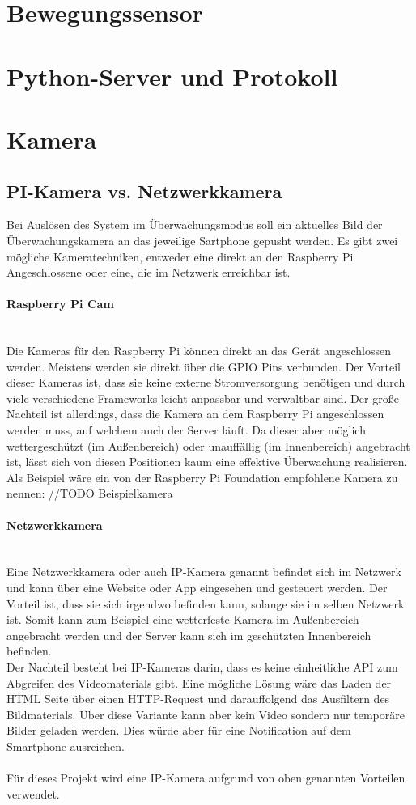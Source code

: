 \section{Bewegungssensor} 

\section{Python-Server und Protokoll} 
\section{Kamera}
\subsection{PI-Kamera vs. Netzwerkkamera}
Bei Auslösen des System im Überwachungsmodus soll ein aktuelles Bild der Überwachungskamera an das jeweilige Sartphone gepusht werden. Es gibt zwei mögliche Kameratechniken, entweder eine direkt an den Raspberry Pi Angeschlossene oder eine, die im Netzwerk erreichbar ist. 
\paragraph{Raspberry Pi Cam} \\
Die Kameras für den Raspberry Pi können direkt an das Gerät angeschlossen werden. Meistens werden sie direkt über die GPIO Pins verbunden. Der Vorteil dieser Kameras ist, dass sie keine externe Stromversorgung benötigen und durch viele verschiedene Frameworks leicht anpassbar und verwaltbar sind. Der große Nachteil ist allerdings, dass die Kamera an dem Raspberry Pi angeschlossen werden muss, auf welchem auch der Server läuft. Da dieser aber möglich wettergeschützt (im Außenbereich) oder unauffällig (im Innenbereich) angebracht ist, lässt sich von diesen Positionen kaum eine effektive Überwachung realisieren. \\
Als Beispiel wäre ein von der Raspberry Pi Foundation empfohlene Kamera zu nennen: //TODO Beispielkamera
\paragraph{Netzwerkkamera} \\
Eine Netzwerkkamera oder auch IP-Kamera genannt befindet sich im Netzwerk und kann über eine Website oder App eingesehen und gesteuert werden. Der Vorteil ist, dass sie sich irgendwo befinden kann, solange sie im selben Netzwerk ist. Somit kann zum Beispiel eine wetterfeste Kamera im Außenbereich angebracht werden und der Server kann sich im geschützten Innenbereich befinden. \\
Der Nachteil besteht bei IP-Kameras darin, dass es keine einheitliche API zum Abgreifen des Videomaterials gibt. Eine mögliche Lösung wäre das Laden der HTML Seite über einen HTTP-Request und darauffolgend das Ausfiltern des Bildmaterials. Über diese Variante kann aber kein Video sondern nur temporäre Bilder geladen werden. Dies würde aber für eine Notification auf dem Smartphone ausreichen. \\\\
Für dieses Projekt wird eine IP-Kamera aufgrund von oben genannten Vorteilen verwendet.
